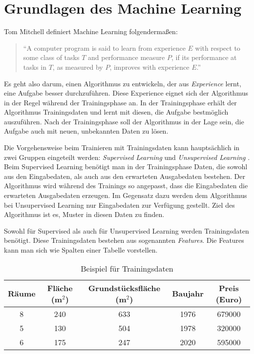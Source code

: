 
\chapter{Grundlagen des Machine Learning}

Tom Mitchell definiert Machine Learning folgendermaßen:
\begin{quote}
    \enquote{A computer program is said to learn from experience $E$ with respect to some class of tasks $T$ and performance measure $P$, if its performance at tasks in $T$, as measured by $P$, improves with experience $E$.} \cite{mitchell1997}
\end{quote}

Es geht also darum, einen Algorithmus zu entwickeln, der aus \textit{Experience} lernt, eine Aufgabe besser durchzuführen. Diese Experience eignet sich der Algorithmus in der Regel während der Trainingsphase an. In der Trainingsphase erhält der Algorithmus Trainingsdaten und lernt mit diesen, die Aufgabe bestmöglich auszuführen. Nach der Trainingsphase soll der Algorithmus in der Lage sein, die Aufgabe auch mit neuen, unbekannten Daten zu lösen.

Die Vorgehensweise beim Trainieren mit Trainingsdaten kann hauptsächlich in zwei Gruppen eingeteilt werden: \textit{Supervised Learning} und \textit{Unsupervised Learning} \cite{Sarkar2018}. Beim Supervised Learning benötigt man in der Trainingsphase Daten, die sowohl aus den Eingabedaten, als auch aus den erwarteten Ausgabedaten bestehen. Der Algorithmus wird während des Trainings so angepasst, dass die Eingabedaten die erwarteten Ausgabedaten erzeugen. Im Gegensatz dazu werden dem Algorithmus bei Unsupervised Learning nur Eingabedaten zur Verfügung gestellt. Ziel des Algorithmus ist es, Muster in diesen Daten zu finden.

Sowohl für Supervised als auch für Unsupervised Learning werden Trainingsdaten benötigt. Diese Trainingsdaten bestehen aus sogenannten \textit{Features}. Die Features kann man sich wie Spalten einer Tabelle vorstellen.

\begin{table}[H]
    \centering
    \begin{tabular}{ || c | c | c | c || c || }
        \hline
        Räume & Fläche (m$^2$) & Grundstücksfläche (m$^2$) & Baujahr & Preis (Euro) \\
        \hline
        8 & 240 & 633 & 1976 & 679000 \\
        5 & 130 & 504 & 1978 & 320000 \\
        6 & 175 & 247 & 2020 & 595000 \\
        \hline
    \end{tabular}
    \caption{Beispiel für Trainingsdaten}
    \label{tbl:trainingdata}
\end{table}

